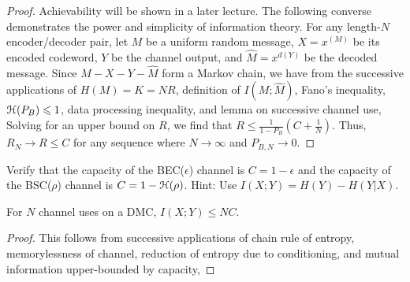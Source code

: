 \documentclass[letterpaper,10pt,english]{article}
\begin{document}
\begin{proof}
Achievability will be shown in a later lecture. 
The following converse demonstrates the power and simplicity of information theory.
For any length-$N$ encoder/decoder pair, let $M$ be a uniform random message, $X = x^{(M)}$ be its encoded codeword, $Y$ be the channel output, and $\hat{M} = x^{d(Y)}$ be the decoded message. 
Since $M - X - Y - \hat{M}$ form a Markov chain, 
we have from the successive applications of $H(M) = K = NR$, definition of $I(M; \hat{M})$, Fano's inequality, $\mathcal{H}(P_B) \leqslant 1$,  data processing inequality, and lemma on successive channel use, 
Solving for an upper bound on $R$, we find that $R \le \frac{1}{1-P_B}\left(C + \frac{1}{N}\right)$. 
Thus, $R_N \to R \le C$ for any sequence where $N \to \infty$ and $P_{B,N} \to 0$. 
\end{proof}
\begin{exerc} 
Verify that the capacity of the BEC($\epsilon$) channel is $C = 1 -\epsilon$ and the capacity
of the BSC($\rho$) channel is $C=1 -\mathcal{H}(\rho)$. 
Hint: Use $I(X;Y)=H(Y)- H(Y|X)$. 
\end{exerc}
\begin{lem}
For $N$ channel uses on a DMC, $I (X;Y ) \le NC$.
\end{lem}   
\begin{proof}
 This follows from successive applications of chain rule of entropy, memorylessness of channel, reduction of entropy due to conditioning, and mutual information upper-bounded by capacity, 
\end{proof}
\end{document}
